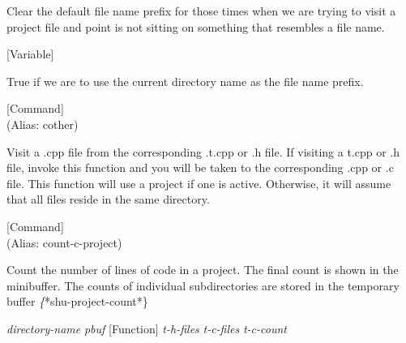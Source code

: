 \begin{doc-string}
Clear the default file name prefix for those times when we are trying to visit
a project file and point is not sitting on something that resembles a file name.
\end{doc-string}

\vspace{1em}
\noindent
{}
\usebox{\funcname}
 \hfill [Variable]

\begin{doc-string}
True if we are to use the current directory name as the file name prefix.
\end{doc-string}

\vspace{1em}
\noindent
{}
\usebox{\funcname}
 \hfill [Command]\\%
 (Alias: cother)

\begin{doc-string}
Visit a .cpp file from the corresponding .t.cpp or .h file.  If visiting a
t.cpp or .h file, invoke this function and you will be taken to the
corresponding .cpp or .c file.  This function will use a project if one is
active.  Otherwise, it will assume that all files reside in the same directory.
\end{doc-string}

\vspace{1em}
\noindent
{}
\usebox{\funcname}
 \hfill [Command]\\%
 (Alias: count-c-project)

\begin{doc-string}
Count the number of lines of code in a project.  The final count is shown in
the minibuffer.  The counts of individual subdirectories are stored in the
temporary buffer \emph\{*shu-project-count*\}
\end{doc-string}

\vspace{1em}
\noindent
{}
\usebox{\funcname}\emph{directory-name} \emph{pbuf}
 \hfill [Function]
\hspace*{\wd\funcname}\emph{t-h-files} \emph{t-c-files}
\hspace*{\wd\funcname}\emph{t-c-count}

